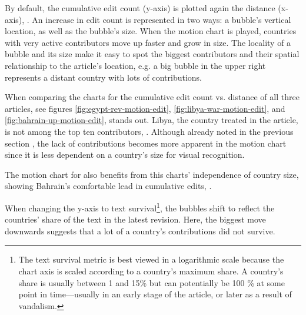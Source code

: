 
By default, the cumulative edit count (y-axis) is plotted again the distance (x-axis), .
An increase in edit count is represented in two ways: a bubble's vertical location, as well as the bubble's size.
When the motion chart is played, countries with very active contributors move up faster and grow in size. 
The locality of a bubble and its size make it easy to spot the biggest contributors and their spatial relationship to the article's location, e.g. a big bubble in the upper right represents a distant country with lots of contributions. 


When comparing the charts for the cumulative edit count vs. distance of all three articles, see figures \ref{fig:egypt-rev-motion-edit}, \ref{fig:libya-war-motion-edit}, and \ref{fig:bahrain-up-motion-edit},  stands out.
Libya, the country treated in the article, is not among the top ten contributors, .
Although already noted in the previous section , the lack of contributions becomes more apparent in the motion chart since it is less dependent on a country's size for visual recognition.

The motion chart for  also benefits from this charts' independence of country size, showing Bahrain's comfortable lead in cumulative edits, .


When changing the y-axis to text survival\footnote{The text survival metric is best viewed in a logarithmic scale because the chart axis is scaled according to a country's maximum share. A country's share is usually between 1 and 15\% but  can potentially be 100 \% at some point in time---usually in an early stage of the article, or later as a result of vandalism.}, the bubbles shift to reflect the countries' share of the text in the latest revision.
Here, the biggest move downwards suggests that a lot of a country's contributions did not survive.


